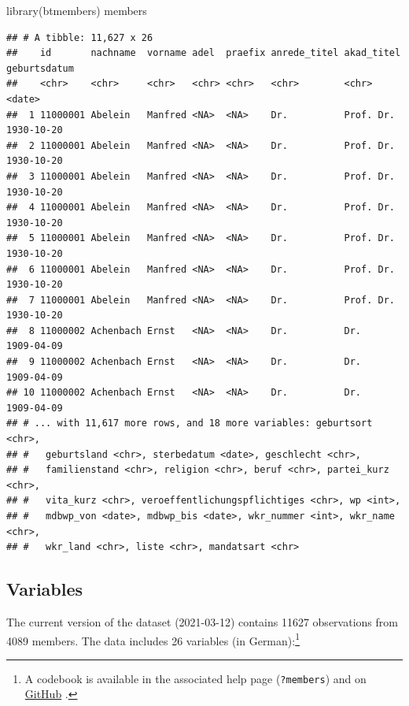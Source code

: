 \documentclass[12pt]{article}
\newenvironment{Shaded}{\begin{snugshade}}{\end{snugshade}}
\newcommand{\FunctionTok}[1]{\textcolor[rgb]{0.00,0.00,0.00}{#1}}
\newcommand{\NormalTok}[1]{#1}
\begin{document}
\begin{Shaded}
\begin{Highlighting}[]
\FunctionTok{library}\NormalTok{(btmembers)}
\NormalTok{members}
\end{Highlighting}
\end{Shaded}

\begin{verbatim}
## # A tibble: 11,627 x 26
##    id       nachname  vorname adel  praefix anrede_titel akad_titel geburtsdatum
##    <chr>    <chr>     <chr>   <chr> <chr>   <chr>        <chr>      <date>      
##  1 11000001 Abelein   Manfred <NA>  <NA>    Dr.          Prof. Dr.  1930-10-20  
##  2 11000001 Abelein   Manfred <NA>  <NA>    Dr.          Prof. Dr.  1930-10-20  
##  3 11000001 Abelein   Manfred <NA>  <NA>    Dr.          Prof. Dr.  1930-10-20  
##  4 11000001 Abelein   Manfred <NA>  <NA>    Dr.          Prof. Dr.  1930-10-20  
##  5 11000001 Abelein   Manfred <NA>  <NA>    Dr.          Prof. Dr.  1930-10-20  
##  6 11000001 Abelein   Manfred <NA>  <NA>    Dr.          Prof. Dr.  1930-10-20  
##  7 11000001 Abelein   Manfred <NA>  <NA>    Dr.          Prof. Dr.  1930-10-20  
##  8 11000002 Achenbach Ernst   <NA>  <NA>    Dr.          Dr.        1909-04-09  
##  9 11000002 Achenbach Ernst   <NA>  <NA>    Dr.          Dr.        1909-04-09  
## 10 11000002 Achenbach Ernst   <NA>  <NA>    Dr.          Dr.        1909-04-09  
## # ... with 11,617 more rows, and 18 more variables: geburtsort <chr>,
## #   geburtsland <chr>, sterbedatum <date>, geschlecht <chr>,
## #   familienstand <chr>, religion <chr>, beruf <chr>, partei_kurz <chr>,
## #   vita_kurz <chr>, veroeffentlichungspflichtiges <chr>, wp <int>,
## #   mdbwp_von <date>, mdbwp_bis <date>, wkr_nummer <int>, wkr_name <chr>,
## #   wkr_land <chr>, liste <chr>, mandatsart <chr>
\end{verbatim}

\hypertarget{variables}{%
\subsection{Variables}\label{variables}}

The current version of the dataset (2021-03-12) contains 11627
observations from 4089 members. The data includes 26 variables (in
German):\footnote{A codebook is available in the associated help page
  (\texttt{?members}) and on
  \href{https://github.com/jolyphil/btmembers/blob/master/codebook/codebook.pdf}{GitHub}
  .}
\end{document}
